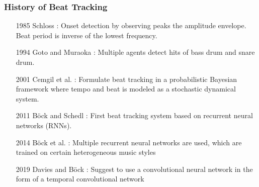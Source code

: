 \documentclass{beamer}
\begin{document}
\begin{frame}
\frametitle{History of Beat Tracking}
\begin{itemize}
\item[1985] Schloss \cite{Schloss1985}: Onset detection by observing peaks the amplitude envelope. Beat period is inverse of the lowest frequency.
\item[1994] Goto and Muraoka \cite{Goto1994}: Multiple agents detect hits of bass drum and snare drum.
\item[2001] Cemgil et al. \cite{Cemgil2001}: Formulate beat tracking in a probabilistic Bayesian framework where tempo and beat is modeled as a stochastic dynamical system.
\item[2011] Böck and Schedl \cite{Boeck2011}: First beat tracking system based on recurrent neural networks (RNNs).
\item[2014] Böck et al. \cite{Boeck2014}: Multiple recurrent neural networks are used, which are trained on certain heterogeneous music styles
\item[2019] Davies and Böck \cite{Davies2019}: Suggest to use a convolutional neural network in the form of a temporal convolutional network 
\end{itemize}
\end{frame}
\end{document}
